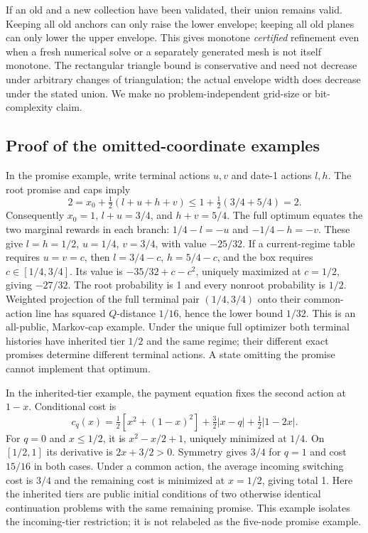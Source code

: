 If an old and a new collection have been validated, their union remains valid. Keeping all old anchors can only raise the lower envelope; keeping all old planes can only lower the upper envelope. This gives monotone \emph{certified} refinement even when a fresh numerical solve or a separately generated mesh is not itself monotone. The rectangular triangle bound is conservative and need not decrease under arbitrary changes of triangulation; the actual envelope width does decrease under the stated union. We make no problem-independent grid-size or bit-complexity claim.

\subsection{Proof of the omitted-coordinate examples}
In the promise example, write terminal actions $u,v$ and date-1 actions $l,h$. The root promise and caps imply
\[
 2=x_0+\tfrac12(l+u+h+v)\leq1+\tfrac12(3/4+5/4)=2.
\]
Consequently $x_0=1$, $l+u=3/4$, and $h+v=5/4$. The full optimum equates the two marginal rewards in each branch: $1/4-l=-u$ and $-1/4-h=-v$. These give $l=h=1/2$, $u=1/4$, $v=3/4$, with value $-25/32$. If a current-regime table requires $u=v=c$, then $l=3/4-c$, $h=5/4-c$, and the box requires $c\in[1/4,3/4]$. Its value is $-35/32+c-c^2$, uniquely maximized at $c=1/2$, giving $-27/32$. The root probability is 1 and every nonroot probability is $1/2$. Weighted projection of the full terminal pair $(1/4,3/4)$ onto their common-action line has squared $Q$-distance $1/16$, hence the lower bound $1/32$. This is an all-public, Markov-cap example. Under the unique full optimizer both terminal histories have inherited tier $1/2$ and the same regime; their different exact promises determine different terminal actions. A state omitting the promise cannot implement that optimum.

In the inherited-tier example, the payment equation fixes the second action at $1-x$. Conditional cost is
\[
 c_q(x)=\tfrac12[x^2+(1-x)^2]+\tfrac32|x-q|+\tfrac12|1-2x|.
\]
For $q=0$ and $x\leq1/2$, it is $x^2-x/2+1$, uniquely minimized at $1/4$. On $[1/2,1]$ its derivative is $2x+3/2>0$. Symmetry gives $3/4$ for $q=1$ and cost $15/16$ in both cases. Under a common action, the average incoming switching cost is $3/4$ and the remaining cost is minimized at $x=1/2$, giving total 1. Here the inherited tiers are public initial conditions of two otherwise identical continuation problems with the same remaining promise. This example isolates the incoming-tier restriction; it is not relabeled as the five-node promise example.

